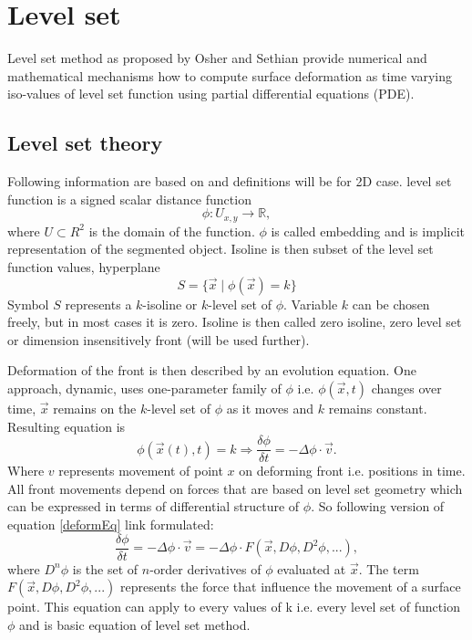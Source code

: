 \section{Level set}

Level set method as proposed by Osher and Sethian \cite{sethianLS} provide numerical and mathematical mechanisms how to compute surface deformation as time varying iso-values of level set function using partial differential equations (PDE).

\subsection{Level set theory}

Following information are based on \cite{insightIntoImages} and definitions will be for 2D case.
level set function is a signed scalar distance function
\begin{equation}
\phi : U_{x,y} \rightarrow \mathbb R,
\end{equation}
where $U \subset R^2$ is the domain of the function.
$\phi$ is called embedding and is implicit representation of the segmented object.
Isoline is then subset of the level set function values, hyperplane
\begin{equation}
S = \{\vec{x}\mid \phi(\vec{x}) = k\}
\end{equation}
Symbol $S$ represents a $k$-isoline or $k$-level set of $\phi$. 
Variable $k$ can be chosen freely, but in most cases it is zero.
Isoline is then called zero isoline, zero level set or dimension insensitively front (will be used further).

\par
Deformation of the front is then described by an evolution equation.
One approach, dynamic, uses one-parameter family of $\phi$ i.e. $\phi(\vec{x},t)$ changes over time, $\vec{x}$ remains on the $k$-level set of $\phi$ as it moves and $k$ remains constant.
Resulting equation is
\begin{equation}
\label{deformEq}
\phi(\vec{x}(t),t) = k \Rightarrow \frac{\delta \phi}{\delta t} = - \Delta \phi
\cdot \vec{v}.
\end{equation}
Where $v$ represents movement of point $x$ on deforming front i.e. positions in time.
All front movements depend on forces that are based on level set geometry which can be expressed in terms of differential structure of $\phi$.
So following version of equation \ref{deformEq} link formulated:
\begin{equation}
\frac{\delta\phi}{\delta t} = - \Delta \phi \cdot \vec{v} = - \Delta \phi
\cdot F(\vec{x}, D\phi, D^2\phi, ...),
\end{equation}
where $D^n\phi$ is the set of $n$-order derivatives of $\phi$ evaluated at $\vec{x}$.
The term $F(\vec{x}, D\phi, D^2\phi, ...)$ represents the force that influence the movement of a surface point.
This equation can apply to every values of k i.e. every level set of function $\phi$ and is basic equation of level set method.

